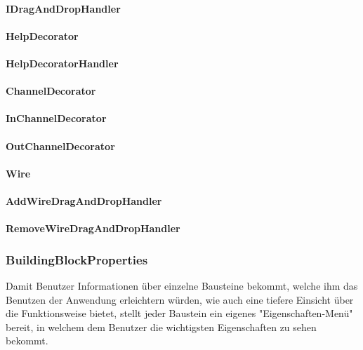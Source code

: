 \documentclass[parskip=full]{scrartcl}
\begin{document}
\paragraph{IDragAndDropHandler}

\paragraph{HelpDecorator}

\paragraph{HelpDecoratorHandler}

\paragraph{ChannelDecorator}

\paragraph{InChannelDecorator}

\paragraph{OutChannelDecorator}

\paragraph{Wire}

\paragraph{AddWireDragAndDropHandler}

\paragraph{RemoveWireDragAndDropHandler}


\newpage 

\subsubsection{BuildingBlockProperties}

Damit Benutzer Informationen über einzelne Bausteine bekommt, welche ihm das Benutzen der Anwendung erleichtern würden, wie auch eine tiefere Einsicht über die Funktionsweise bietet, stellt jeder Baustein ein eigenes "Eigenschaften-Menü" bereit, in welchem dem Benutzer die wichtigsten Eigenschaften zu sehen bekommt.
\end{document}
